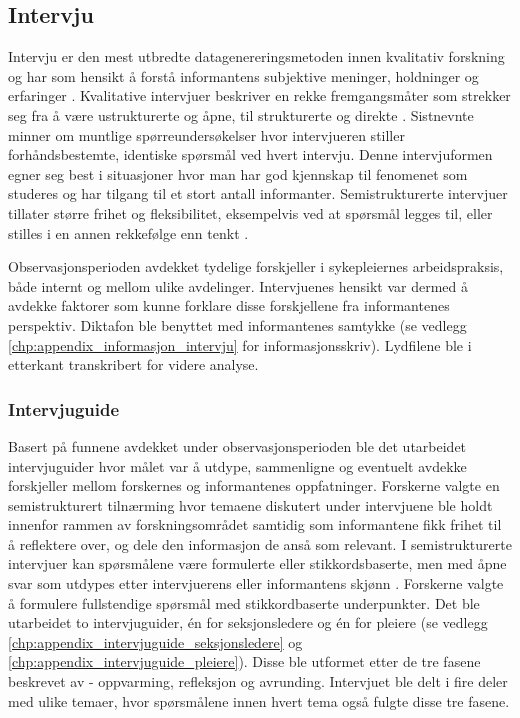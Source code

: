 \subsection{Intervju}
\label{sec:intervju}
Intervju er den mest utbredte datagenereringsmetoden innen kvalitativ forskning og har som hensikt å forstå informantens subjektive meninger, holdninger og erfaringer \citep{Tjora}. Kvalitative intervjuer beskriver en rekke fremgangsmåter som strekker seg fra å være ustrukturerte og åpne, til strukturerte og direkte \citep{Smith12}. Sistnevnte minner om muntlige spørreundersøkelser hvor intervjueren stiller forhåndsbestemte, identiske spørsmål ved hvert intervju. Denne intervjuformen egner seg best i situasjoner hvor man har god kjennskap til fenomenet som studeres og har tilgang til et stort antall informanter. Semistrukturerte intervjuer tillater større frihet og fleksibilitet, eksempelvis ved at spørsmål legges til, eller stilles i en annen rekkefølge enn tenkt \citep{Tjora}.
 
\noindent
Observasjonsperioden avdekket tydelige forskjeller i sykepleiernes arbeidspraksis, både internt og mellom ulike avdelinger. Intervjuenes hensikt var dermed å avdekke faktorer som kunne forklare disse forskjellene fra informantenes perspektiv. Diktafon ble benyttet med informantenes samtykke (se vedlegg \ref{chp:appendix_informasjon_intervju} for informasjonsskriv). Lydfilene ble i etterkant transkribert for videre analyse.
 
\subsubsection{Intervjuguide}
Basert på funnene avdekket under observasjonsperioden ble det utarbeidet intervjuguider hvor målet var å utdype, sammenligne og eventuelt avdekke forskjeller mellom forskernes og informantenes oppfatninger. Forskerne valgte en semistrukturert tilnærming hvor temaene diskutert under intervjuene ble holdt innenfor rammen av forskningsområdet samtidig som informantene fikk frihet til å reflektere over, og dele den informasjon de anså som relevant. I semistrukturerte intervjuer kan spørsmålene være formulerte eller stikkordsbaserte, men med åpne svar som utdypes etter intervjuerens eller informantens skjønn \citep{Schensul99}. Forskerne valgte å formulere fullstendige spørsmål med stikkordbaserte underpunkter. Det ble utarbeidet to intervjuguider, én for seksjonsledere og én for pleiere (se vedlegg \ref{chp:appendix_intervjuguide_seksjonsledere} og \ref{chp:appendix_intervjuguide_pleiere}). Disse ble utformet etter de tre fasene beskrevet av \citet{Tjora} - oppvarming, refleksjon og avrunding. Intervjuet ble delt i fire deler med ulike temaer, hvor spørsmålene innen hvert tema også fulgte disse tre fasene.
 
